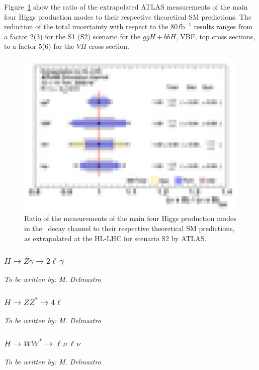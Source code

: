 Figure~\ref{fig:Hyy_ATLAS_HLLHC_S2} show the ratio of the extrapolated ATLAS measurements of the main four Higgs production modes to their respective theoretical SM predictions. The reduction of the total uncertainty with respect to the 80\,$\mathrm{fb}^{-1}$ results ranges from a factor 2(3) for the S1 (S2) scenario for the $ggH+b\bar{b}H$, VBF, top cross sections, to a factor 5(6) for the $VH$ cross section.

\begin{figure}
  \centering
  \includegraphics[width=0.6\linewidth]{section2/plots/channels/ATLAS_Hyy_compareToSM_prodXS}
  \caption{Ratio of the measurements of the main four Higgs production modes in the \Hyy\ decay channel to their respective theoretical SM predictions, as extrapolated at the HL-LHC for scenario S2 by ATLAS.}
  \label{fig:Hyy_ATLAS_HLLHC_S2}
\end{figure}


\subsubsection{$H \to Z\gamma \to 2\ell\,\gamma$}
{\it To be written by: M. Delmastro}

\subsubsection{$H \to ZZ^* \to 4\ell$}
{\it To be written by: M. Delmastro}

\subsubsection{$H \to WW^* \to \ell\nu\,\ell\nu$}
{\it To be written by: M. Delmastro}